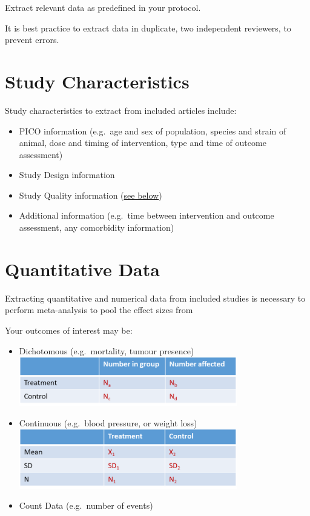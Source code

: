 \documentclass[
]{book}
\begin{document}
Extract relevant data as predefined in your protocol.

It is best practice to extract data in duplicate, two independent reviewers, to prevent errors.

\hypertarget{study-characteristics}{%
\section{Study Characteristics}\label{study-characteristics}}

Study characteristics to extract from included articles include:

\begin{itemize}
\item
  PICO information (e.g.~age and sex of population, species and strain of animal, dose and timing of intervention, type and time of outcome assessment)
\item
  Study Design information
\item
  Study Quality information (\protect\hyperlink{Quality-Assessment}{see below})
\item
  Additional information (e.g.~time between intervention and outcome assessment, any comorbidity information)
\end{itemize}

\hypertarget{quantitative-data}{%
\section{Quantitative Data}\label{quantitative-data}}

Extracting quantitative and numerical data from included studies is necessary to perform meta-analysis to pool the effect sizes from

Your outcomes of interest may be:

\begin{itemize}
\item
  Dichotomous (e.g.~mortality, tumour presence) \includegraphics[width=0.75\textwidth,height=0.75\textheight]{figs/dichot-outcome.png}
\item
  Continuous (e.g.~blood pressure, or weight loss) \includegraphics[width=0.75\textwidth,height=0.75\textheight]{figs/contin-outcome.png}
\item
  Count Data (e.g.~number of events)
\end{itemize}
\end{document}
